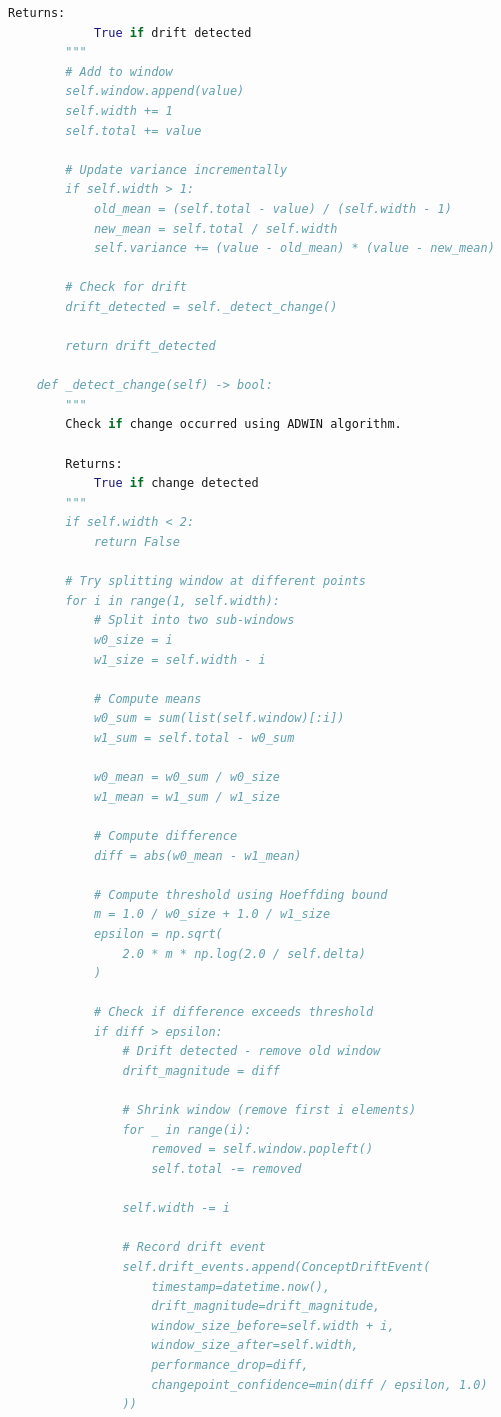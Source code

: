 \begin{lstlisting}[language=Python, caption={Concept Drift Detection with ADWIN}]
        Returns:
            True if drift detected
        """
        # Add to window
        self.window.append(value)
        self.width += 1
        self.total += value

        # Update variance incrementally
        if self.width > 1:
            old_mean = (self.total - value) / (self.width - 1)
            new_mean = self.total / self.width
            self.variance += (value - old_mean) * (value - new_mean)

        # Check for drift
        drift_detected = self._detect_change()

        return drift_detected

    def _detect_change(self) -> bool:
        """
        Check if change occurred using ADWIN algorithm.

        Returns:
            True if change detected
        """
        if self.width < 2:
            return False

        # Try splitting window at different points
        for i in range(1, self.width):
            # Split into two sub-windows
            w0_size = i
            w1_size = self.width - i

            # Compute means
            w0_sum = sum(list(self.window)[:i])
            w1_sum = self.total - w0_sum

            w0_mean = w0_sum / w0_size
            w1_mean = w1_sum / w1_size

            # Compute difference
            diff = abs(w0_mean - w1_mean)

            # Compute threshold using Hoeffding bound
            m = 1.0 / w0_size + 1.0 / w1_size
            epsilon = np.sqrt(
                2.0 * m * np.log(2.0 / self.delta)
            )

            # Check if difference exceeds threshold
            if diff > epsilon:
                # Drift detected - remove old window
                drift_magnitude = diff

                # Shrink window (remove first i elements)
                for _ in range(i):
                    removed = self.window.popleft()
                    self.total -= removed

                self.width -= i

                # Record drift event
                self.drift_events.append(ConceptDriftEvent(
                    timestamp=datetime.now(),
                    drift_magnitude=drift_magnitude,
                    window_size_before=self.width + i,
                    window_size_after=self.width,
                    performance_drop=diff,
                    changepoint_confidence=min(diff / epsilon, 1.0)
                ))


\end{lstlisting}
